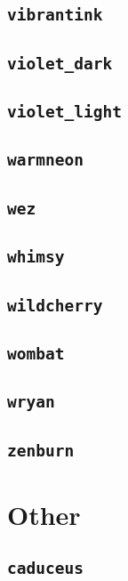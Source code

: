 \subsection{\texttt{vibrantink}}
\newpage
\subsection{\texttt{violet\_dark}}
\newpage
\subsection{\texttt{violet\_light}}
\newpage
\subsection{\texttt{warmneon}}
\newpage
\subsection{\texttt{wez}}
\newpage
\subsection{\texttt{whimsy}}
\newpage
\subsection{\texttt{wildcherry}}
\newpage
\subsection{\texttt{wombat}}
\newpage
\subsection{\texttt{wryan}}
\newpage
\subsection{\texttt{zenburn}}
\newpage

\section{Other}

\subsection{\texttt{caduceus}}
\newpage


